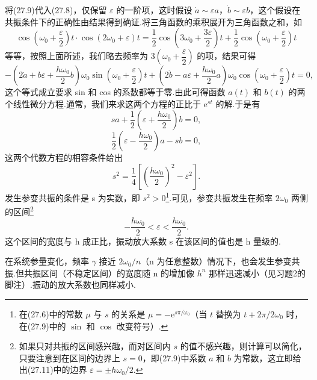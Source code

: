 将(27.9)代入(27.8)，仅保留 $\varepsilon$ 的一阶项，这时假设 $\dot{a}\sim\varepsilon a$，$\dot{b}\sim\varepsilon b$，这个假设在共振条件下的正确性由结果得到确证.将三角函数的乘积展开为三角函数之和，如
\begin{equation*}
  \cos\left(\omega_0+\frac{\varepsilon}{2}\right)t\cdot\cos(2\omega_0+\varepsilon)t
  =\frac{1}{2}\cos\left(3\omega_0+\frac{3\varepsilon}{2}\right)t
  +\frac{1}{2}\cos\left(\omega_0+\frac{\varepsilon}{2}\right)t
\end{equation*}
等等，按照上面所述，我们略去频率为 $3\left(\omega_0+\dfrac{\varepsilon}{2}\right)$ 的项，结果可得
\begin{equation*}
  -\left(2\dot{a}+b\varepsilon+\frac{h\omega_0}{2}b\right)\omega_0
  \sin\left(\omega_0+\frac{\varepsilon}{2}\right)t
  +\left(2\dot{b}-a\varepsilon+\frac{h\omega_0}{2}a\right)\omega_0
  \cos\left(\omega_0+\frac{\varepsilon}{2}\right)t=0,
\end{equation*}
这个等式成立要求 sin 和 cos 的系数都等于零.由此可得函数 $a(t)$ 和 $b(t)$ 的两个线性微分方程.通常，我们来求这两个方程的正比于 $\mathrm{e}^{st}$ 的解.于是有
\begin{equation*}
  sa+\frac{1}{2}\left(\varepsilon+\frac{h\omega_0}{2}\right)b=0,
\end{equation*}
\begin{equation*}
  \frac{1}{2}\left(\varepsilon-\frac{h\omega_0}{2}\right)a-sb=0,
\end{equation*}
这两个代数方程的相容条件给出
\begin{equation}
  s^2=\frac{1}{4}\left[\left(\frac{h\omega_0}{2}\right)^2-\varepsilon^2\right].
\end{equation}
发生参变共振的条件是 s 为实数，即 $s^2>0$\footnote{在(27.6)中的常数 $\mu$ 与 $s$ 的关系是 $\mu=-\mathrm{e}^{s\pi/\omega_0}$（当 $t$ 替换为 $t+2\pi/2\omega_0$ 时，在(27.9)中的 $\sin$ 和 $\cos$ 改变符号）.}.可见，参变共振发生在频率 $2\omega_0$ 两侧的区间\footnote{如果只对共振的区间感兴趣，而对区间内 $s$ 的值不感兴趣，则计算可以简化，只要注意到在区间的边界上 $s=0$，即(27.9)中系数 $a$ 和 $b$ 为常数，这立即给出(27.11)中的边界 $\varepsilon=\pm h\omega_0/2$.}
\begin{equation}
  -\frac{h\omega_0}{2}<\varepsilon<\frac{h\omega_0}{2}.
\end{equation}
这个区间的宽度与 h 成正比，振动放大系数 s 在该区间的值也是 h 量级的.

在系统参量变化，频率 $\gamma$ 接近 $2\omega_0/n$（n 为任意整数）情况下，也会发生参变共振.但共振区间（不稳定区间）的宽度随 n 的增加像 $h^n$ 那样迅速减小（见习题2的脚注）.振动的放大系数也同样减小.

